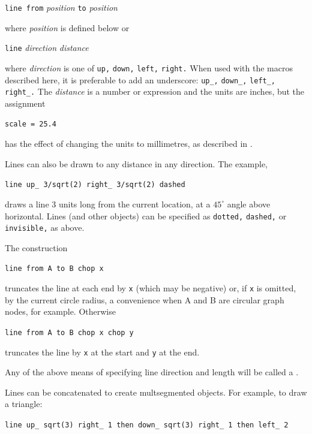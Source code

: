 {\tt line from} {\sl position} {\tt to} {\sl position}

\noindent
where {\sl position} is defined below or

{\tt line} {\sl direction} {\sl distance}

\noindent
where {\sl direction} is one of {\tt up,} {\tt down,} {\tt left,}
{\tt right.}  When used with the \Mfour macros described here, it is
preferable to add an underscore: {\tt up\_,} {\tt down\_,} {\tt left\_,}
{\tt right\_.}  The {\sl distance} is a number or expression
and the units are inches, but the assignment

{\tt scale = 25.4}

\noindent
has the effect of changing the units to millimetres,
as described in .

Lines can also be drawn to any distance in any direction.  The example,

{\tt line up\_ 3/sqrt(2) right\_ 3/sqrt(2) dashed}

\noindent
draws a line 3 units long from the current location,
at a $45^\circ$ angle above horizontal.
Lines (and other objects) can be specified as {\tt dotted,} {\tt dashed,} or
{\tt invisible,} as above.

The construction

{\tt line from A to B chop x}

\noindent
truncates the line at each end by {\tt x} (which may be negative)
or, if {\tt x} is omitted, by
the current circle radius, a convenience when A and B are
circular graph nodes, for example.  Otherwise

{\tt line from A to B chop x chop y}

\noindent
truncates the line by {\tt x} at the start and {\tt y} at the end.

Any of the above means of specifying line direction and length
will be called a \linespec.

Lines can be concatenated to create multsegmented objects.
For example, to draw a triangle:

{\tt line up\_ sqrt(3) right\_ 1 then down\_ sqrt(3) right\_ 1 then left\_ 2}

